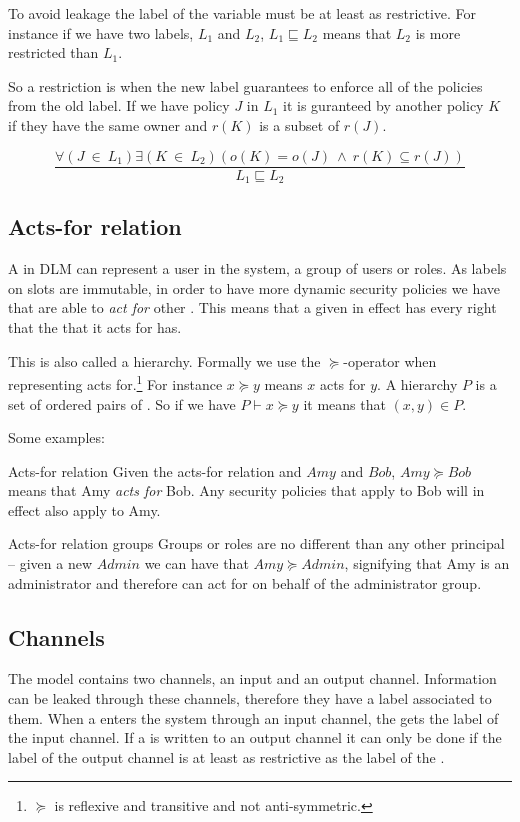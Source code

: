 To avoid leakage the label of the variable must be at least as restrictive.
For instance if we have two labels, $L_1$ and $L_2$, $L_1 \sqsubseteq L_2$ means that $L_2$ is more restricted than $L_1$.

\begin{definition}
  So a restriction is when the new label guarantees to enforce all of the policies from the old label.
  If we have policy $J$ in $L_1$ it is guranteed by another policy $K$ if they have the same owner and $r(K)$ is a subset of $r(J)$.
  \begin{center}
    \[\frac{\forall (J \ \in \ L_1) \exists (K \ \in \ L_2)(o(K) = o(J) \ \wedge \ r(K) \subseteq r(J))}{L_1 \sqsubseteq L_2}\]    
  \end{center}
\end{definition}

\subsection{Acts-for relation}
A \principal{} in DLM can represent a user in the system, a group of users or roles.
As labels on slots are immutable, in order to have more dynamic security policies we have that \principals{} are able to \textit{act for} other \principals{}.
This means that a given \principal{} in effect has every right that the \principal{} that it acts for has.

This is also called a \principal{} hierarchy.
Formally we use the $\succeq$-operator when representing acts for.\footnote{$\succeq$ is reflexive and transitive and not anti-symmetric.}
For instance $x \succeq y$ means $x$ acts for $y$.
A \principal{} hierarchy $P$ is a set of ordered pairs of \principals{}.
So if we have $P \vdash x \succeq y$ it means that $(x,y) \in P$.

Some examples:
\begin{example}{Acts-for relation}
  Given the acts-for relation and \principals{} $Amy$ and $Bob$, $Amy \succeq Bob$ means that Amy \textit{acts for} Bob.
  Any security policies that apply to Bob will in effect also apply to Amy.
\end{example}
\begin{example}{Acts-for relation groups}
  Groups or roles are no different than any other principal -- given a new \principal{} $Admin$ we can have that $Amy \succeq Admin$, signifying that Amy is an administrator and therefore can act for on behalf of the administrator group. 
\end{example}
\subsection{Channels}
The model contains two channels, an input and an output channel.
Information can be leaked through these channels, therefore they have a label associated to them.
When a \xvalue{} enters the system through an input channel, the \xvalue{} gets the label of the input channel.
If a \xvalue{} is written to an output channel it can only be done if the label of the output channel is at least as restrictive as the label of the \xvalue{}.

